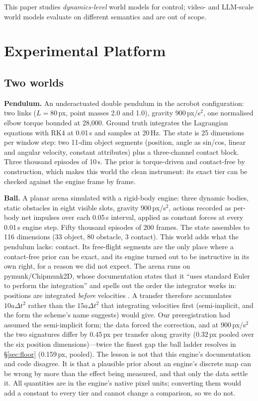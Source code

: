\documentclass{article}
\begin{document}
This paper studies \emph{dynamics-level} world models for control; video- and LLM-scale world models evaluate on different semantics \citep{wm_survey2026} and are out of scope.

\section{Experimental Platform}\label{sec:platform}

\subsection{Two worlds}

\textbf{Pendulum.} An underactuated double pendulum in the acrobot configuration: two links ($L=80$\,px, point masses 2.0 and 1.0), gravity 900\,px/s$^2$, one normalised elbow torque bounded at 28{,}000. Ground truth integrates the Lagrangian equations with RK4 at 0.01\,s and samples at 20\,Hz. The state is 25 dimensions per window step: two 11-dim object segments (position, angle as sin/cos, linear and angular velocity, constant attributes) plus a three-channel contact block. Three thousand episodes of 10\,s. The prior is torque-driven and contact-free by construction, which makes this world the clean instrument: its exact tier can be checked against the engine frame by frame.

\textbf{Ball.} A planar arena simulated with a rigid-body engine: three dynamic bodies, static obstacles in eight visible slots, gravity 900\,px/s$^2$, actions recorded as per-body net impulses over each 0.05\,s interval, applied as constant forces at every 0.01\,s engine step. Fifty thousand episodes of 200 frames. The state assembles to 116 dimensions (33 object, 80 obstacle, 3 contact). This world adds what the pendulum lacks: contact. Its free-flight segments are the only place where a contact-free prior can be exact, and its engine turned out to be instructive in its own right, for a reason we did not expect. The arena runs on pymunk/Chipmunk2D, whose documentation states that it ``uses standard Euler to perform the integration'' and spells out the order the integrator works in: positions are integrated \emph{before} velocities \citep{pymunk2025}. A transfer therefore accumulates $10a\Delta t^2$ rather than the $15a\Delta t^2$ that integrating velocities first (semi-implicit, and the form the scheme's name suggests) would give. Our preregistration had assumed the semi-implicit form; the data forced the correction, and at 900\,px/s$^2$ the two signatures differ by 0.45\,px per transfer along gravity ($0.32$\,px pooled over the six position dimensions)---twice the finest gap the ball ladder resolves in \S\ref{sec:floor} (0.159\,px, pooled). The lesson is not that this engine's documentation and code disagree. It is that a plausible prior about an engine's discrete map can be wrong by more than the effect being measured, and that only the data settle it. All quantities are in the engine's native pixel units; converting them would add a constant to every tier and cannot change a comparison, so we do not.
\end{document}
